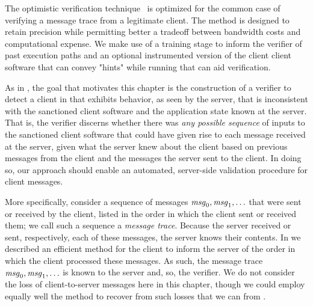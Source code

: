 The optimistic verification technique~\cite{cochran13:toward} is
optimized for the common case of verifying a message trace from a
legitimate client. The method is designed to retain precision while
permitting better a tradeoff between bandwidth costs and computational
expense. We make use of a training stage to inform the verifier of
past execution paths and an optional instrumented version of the
client client software that can convey "hints" while running that can
aid verification. 

As in , the goal that motivates this chapter is the
construction of a verifier to detect a client in that exhibits
behavior, as seen by the server, that is inconsistent with the
sanctioned client software and the application state known at the
server.  That is, the verifier discerns whether there was {\em any
possible sequence} of inputs to the sanctioned client software that
could have given rise to each message received at the server, given
what the server knew about the client based on previous messages from
the client and the messages the server sent to the client. In doing
so, our approach should enable an automated, server-side validation
procedure for client messages.

More specifically, consider a sequence of messages $\mathit{msg}_{0}, \mathit{msg}_{1},
\ldots$ that were sent or received by the client, listed in the order
in which the client sent or received them; we call such a sequence a
\textit{message trace}.  Because the server received or sent,
respectively, each of these messages, the server knows their
contents. In  we described an efficient method
for the client to inform the server of the order in which the client
processed these messages.  As such, the message
trace $\mathit{msg}_{0}, \mathit{msg}_{1}, \ldots$ is known to the server and, so, the
verifier. We do not consider the loss of client-to-server
messages here in this chapter, though we could employ equally well
the method to recover from such losses that we can from
.

